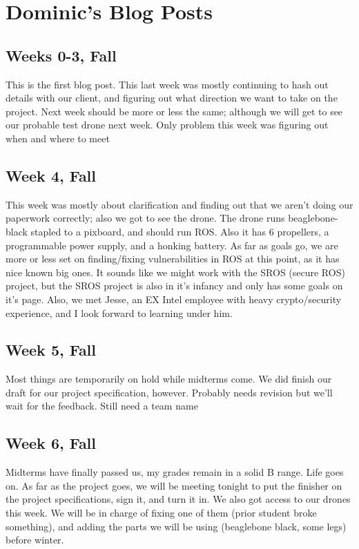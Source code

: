 \documentclass[IEEEtran,letterpaper,10pt,notitlepage,draftclsnofoot,onecolumn]{article}
\begin{document}
\section{Dominic's Blog Posts}
\begin{sloppypar}
\subsection{Weeks 0-3, Fall}
This is the first blog post. This last week was mostly continuing to hash out 
details with our client, and figuring out what direction we want to take on 
the project. Next week should be more or less the same; although we will get 
to see our probable test drone next week. Only problem this week was figuring 
out when and where to meet
\subsection{Week 4, Fall}
This week was mostly about clarification and finding out that we aren't doing 
our paperwork correctly; also we got to see the drone. The drone runs 
beaglebone-black stapled to a pixboard, and should run ROS. Also it has 6 
propellers, a programmable power supply, and a honking battery. 
As far as goals go, we are more or less set on finding/fixing vulnerabilities 
in ROS at this point, as it has nice known big ones. It sounds like we might 
work with the SROS (secure ROS) project, but the SROS project is also in it's 
infancy and only has some goals on it's page. Also, we met Jesse, an EX Intel 
employee with heavy crypto/security experience, and I look forward to learning 
under him.
\subsection{Week 5, Fall}
Most things are temporarily on hold while midterms come. We did finish our 
draft for our project specification, however. Probably needs revision but 
we'll wait for the feedback. Still need a team name
\subsection{Week 6, Fall}
Midterms have finally passed us, my grades remain in a solid B range. Life 
goes on. As far as the project goes, we will be meeting tonight to put the 
finisher on the project specifications, sign it, and turn it in. We also got 
access to our drones this week. We will be in charge of fixing one of them 
(prior student broke something), and adding the parts we will be using 
(beaglebone black, some legs) before winter.

\end{sloppypar}
\end{document}
